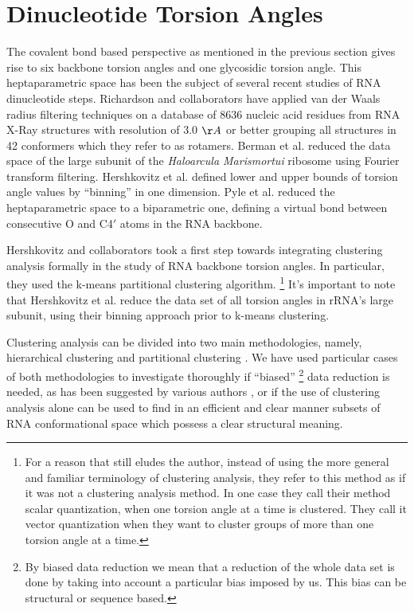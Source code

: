 \section{Dinucleotide   Torsion  Angles}   The  covalent   bond  based
perspective as  mentioned in  the previous section  gives rise  to six
backbone  torsion  angles  and  one  glycosidic  torsion  angle.  This
heptaparametric space  has been the subject of  several recent studies
of    RNA   dinucleotide    steps.   Richardson    and   collaborators
\cite{murray2003}  have   applied  van  der   Waals  radius  filtering
techniques on a database of  8636 nucleic acid residues from RNA X-Ray
structures  with  resolution  of  3.0  $\AA$ or  better  grouping  all
structures in 42 conformers which they refer to as rotamers. Berman et
al. \cite{schneider2004}  reduced the data space of  the large subunit
of   the  \textit{Haloarcula   Marismortui}  ribosome   using  Fourier
transform filtering. Hershkovitz et al. \cite{hershkovitz2003} defined
lower and upper  bounds of torsion angle values  by ``binning'' in one
dimension. Pyle  et al. \cite{wadley2007}  reduced the heptaparametric
space  to  a  biparametric   one,  defining  a  virtual  bond  between
consecutive O and C4$\prime$ atoms in the RNA backbone.

Hershkovitz and collaborators \cite{hershkovitz2006} took a first
step towards integrating clustering  analysis formally in the study of
RNA  backbone torsion  angles. In  particular, they  used  the k-means
partitional  clustering algorithm. \footnote{For  a reason  that still
eludes  the author,  instead of  using  the more  general and  familiar
terminology  of clustering  analysis,  they refer to  this
method as if it was not a clustering analysis method. In one case they
call their method scalar quantization, when one torsion angle
at a time is clustered. They call it vector
quantization when they want to cluster groups of more than one torsion
angle  at a time.}   It's important  to note  that Hershkovitz  et al.
reduce the  data set  of all torsion  angles in rRNA's  large subunit,
using their binning approach prior to k-means clustering.

Clustering analysis  can be divided into two  main methodologies,
namely,  hierarchical    clustering   and    partitional    clustering
\cite{jain1999}. We  have used particular cases  of both methodologies
to  investigate  thoroughly  if  ``biased'' \footnote{By  biased  data
reduction we  mean that a reduction of  the whole data set  is done by
taking into account a particular bias  imposed by us. This bias can be
structural or sequence  based.}  data reduction is needed,  as has been
suggested by various authors \cite{schneider2004, hershkovitz2006}, or
if the  use of  clustering analysis alone  can be  used to find  in an
efficient and  clear manner subsets of RNA  conformational space which
possess a clear structural meaning.

